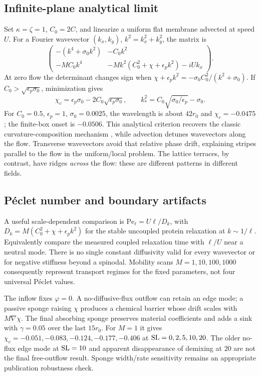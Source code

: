 \subsection{Infinite-plane analytical limit}
Set $\kappa=\zeta=1$, $C_0=2C$, and linearize a uniform flat membrane advected at speed $U$. For a Fourier wavevector $(k_x,k_y)$, $k^2=k_x^2+k_y^2$, the matrix is
\begin{equation}
\begin{pmatrix}
-(k^4+\sigma_0k^2)&-C_0k^2\\
-MC_0k^4&-Mk^2(C_0^2+\chi+\epsilon_pk^2)-iUk_x
\end{pmatrix}.
\end{equation}
At zero flow the determinant changes sign when
$\chi+\epsilon_pk^2=-\sigma_0C_0^2/(k^2+\sigma_0)$. If $C_0>\sqrt{\epsilon_p\sigma_0}$, minimization gives
\begin{equation}
\chi_c=\epsilon_p\sigma_0-2C_0\sqrt{\epsilon_p\sigma_0},\qquad
k_*^2=C_0\sqrt{\sigma_0/\epsilon_p}-\sigma_0.
\end{equation}
For $C_0=0.5$, $\epsilon_p=1$, $\sigma_0=0.0025$, the wavelength is about $42r_0$ and $\chi_c=-0.0475$; the finite-box onset is $-0.0506$. This analytical criterion recovers the classic curvature-composition mechanism \cite{leibler}, while advection detunes wavevectors along the flow. Transverse wavevectors avoid that relative phase drift, explaining stripes parallel to the flow in the uniform/local problem. The lattice terraces, by contrast, have ridges \emph{across} the flow: these are different patterns in different fields.

\subsection{P\'eclet number and boundary artifacts}
A useful scale-dependent comparison is $\mathrm{Pe}_\ell=U\ell/D_k$, with $D_k=M(C_0^2+\chi+\epsilon_pk^2)$ for the stable uncoupled protein relaxation at $k\sim1/\ell$. Equivalently compare the measured coupled relaxation time with $\ell/U$ near a neutral mode. There is no single constant diffusivity valid for every wavevector or for negative stiffness beyond a spinodal. Mobility scans $M=1,10,100,1000$ consequently represent transport regimes for the fixed parameters, not four universal P\'eclet values.

The inflow fixes $\varphi=0$. A no-diffusive-flux outflow can retain an edge mode; a passive sponge raising $\chi$ produces a chemical barrier whose drift scales with $M\nabla\chi$. The final absorbing sponge preserves material coefficients and adds a sink with $\gamma=0.05$ over the last $15r_0$. For $M=1$ it gives $\chi_c=-0.051,-0.083,-0.124,-0.177,-0.406$ at $\mathrm{SL}=0,2,5,10,20$. The older no-flux edge mode at $\mathrm{SL}=10$ and apparent disappearance of demixing at $20$ are not the final free-outflow result. Sponge width/rate sensitivity remains an appropriate publication robustness check.

